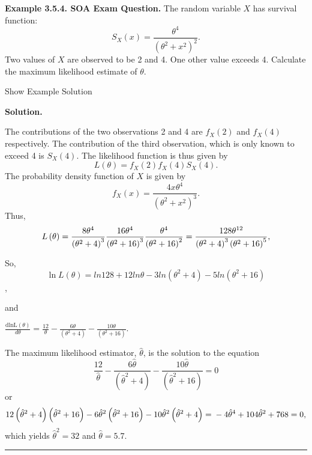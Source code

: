 \documentclass[]{book}
\theoremstyle{definition}
\theoremstyle{definition}
\theoremstyle{definition}
\theoremstyle{remark}
\begin{document}
\textbf{Example 3.5.4. SOA Exam Question.} The random variable \(X\) has
survival function:
\[S_{X}\left( x \right) = \frac{\theta^{4}}{\left( \theta^{2} + x^{2} \right)^{2}}.\]
Two values of \(X\) are observed to be 2 and 4. One other value exceeds
4. Calculate the maximum likelihood estimate of \(\theta\).

Show Example Solution

\hypertarget{toggleExampleLoss.5.4}{}
\textbf{Solution.}

The contributions of the two observations 2 and 4 are
\(f_{X}\left( 2 \right)\) and \(f_{X}\left( 4 \right)\) respectively.
The contribution of the third observation, which is only known to exceed
4 is \(S_{X}\left( 4 \right)\). The likelihood function is thus given by
\[L\left( \theta \right) = f_{X}\left( 2 \right)f_{X}\left( 4 \right)S_{X}\left( 4 \right).\]
The probability density function of \(X\) is given by
\[f_{X}\left( x \right) = \frac{4x\theta^{4}}{\left( \theta^{2} + x^{2} \right)^{3}}.\]
Thus,
\[L\left( \theta \right) = \frac{8\theta^{4}}{\left( \theta^{2} + 4 \right)^{3}}\frac{16\theta^{4}}{\left( \theta^{2} + 16 \right)^{3}}\frac{\theta^{4}}{\left( \theta^{2} + 16 \right)^{2}} = \\
\frac{128\theta^{12}}{\left( \theta^{2} + 4 \right)^{3}\left( \theta^{2} + 16 \right)^{5}},\]

So,
\[\ln L\left( \theta \right) = ln128 + 12ln\theta - 3ln\left( \theta^{2} + 4 \right) - 5ln\left( \theta^{2} + 16 \right)\],

and

\(\frac{\text{dlnL}\left( \theta \right)}{d \theta} = \frac{12}{\theta} - \frac{6\theta}{\left( \theta^{2} + 4 \right)} - \frac{10\theta}{\left( \theta^{2} + 16 \right)}\).

The maximum likelihood estimator, \(\hat{\theta}\), is the solution to
the equation
\[\frac{12}{\hat{\theta}} - \frac{6\hat{\theta}}{\left( {\hat{\theta}}^{2} + 4 \right)} - \frac{10\hat{\theta}}{\left( {\hat{\theta}}^{2} + 16 \right)} = 0\]
or
\[12\left( {\hat{\theta}}^{2} + 4 \right)\left( {\hat{\theta}}^{2} + 16 \right) - 6{\hat{\theta}}^{2}\left( {\hat{\theta}}^{2} + 16 \right) - 10{\hat{\theta}}^{2}\left( {\hat{\theta}}^{2} + 4 \right) = \\
- 4{\hat{\theta}}^{4} + 104{\hat{\theta}}^{2} + 768 = 0,\] which yields
\({\hat{\theta}}^{2} = 32\) and \(\hat{\theta} = 5.7\).

\begin{center}\rule{0.5\linewidth}{\linethickness}\end{center}
\end{document}
